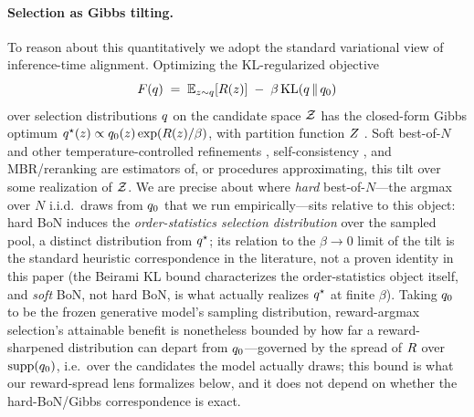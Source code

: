 \paragraph{Selection as Gibbs tilting.}
To reason about this quantitatively we adopt the standard variational view of inference-time alignment. Optimizing the KL-regularized objective
\[
F\!\left(q\right) \;=\; \mathbb{E}_{z\sim q}[R(z)] \;-\; \beta\,\mathrm{KL}\!\left(q \,\|\, q_{0}\right)
\]
over selection distributions $q$ on the candidate space $\mathcal{Z}$ has the closed-form Gibbs optimum $q^{\star}(z)\propto q_{0}(z)\exp(R(z)/\beta)$, with partition function $Z$ \citep{korbak2022kl,beirami2024bon}. Soft best-of-$N$ and other temperature-controlled refinements \citep{verdun2025softbon,yang2024asymptotics,gui2024bonbon}, self-consistency \citep{wang2023selfconsistency}, and MBR/reranking \citep{ichihara2025mbr,mbrasr2025} are estimators of, or procedures approximating, this tilt over some realization of $\mathcal{Z}$. We are precise about where \emph{hard} best-of-$N$---the argmax over $N$ i.i.d.\ draws from $q_{0}$ that we run empirically---sits relative to this object: hard BoN induces the \emph{order-statistics selection distribution} over the sampled pool, a distinct distribution from $q^{\star}$; its relation to the $\beta\!\to\!0$ limit of the tilt is the standard heuristic correspondence in the literature, not a proven identity in this paper (the Beirami KL bound \citep{beirami2024bon} characterizes the order-statistics object itself, and \emph{soft} BoN, not hard BoN, is what actually realizes $q^{\star}$ at finite $\beta$). Taking $q_{0}$ to be the frozen generative model's sampling distribution, reward-argmax selection's attainable benefit is nonetheless bounded by how far a reward-sharpened distribution can depart from $q_{0}$---governed by the spread of $R$ over $\operatorname{supp}(q_{0})$, i.e.\ over the candidates the model actually draws; this bound is what our reward-spread lens formalizes below, and it does not depend on whether the hard-BoN/Gibbs correspondence is exact.

